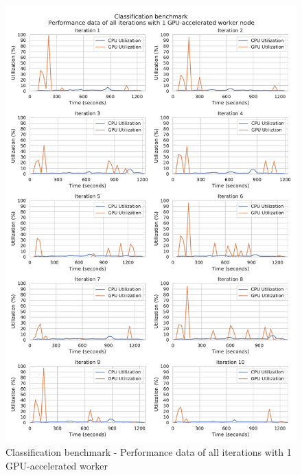 \begin{figure}[h]
\centering
\includegraphics[scale=0.5]{images/appendix/evaluation_data/classification_benchmark/classification_gpu1_performance}
\caption{Classification benchmark - Performance data of all iterations with 1 GPU-accelerated worker}
\label{fig:appendix_eval_classification_gpu1}
\end{figure}

